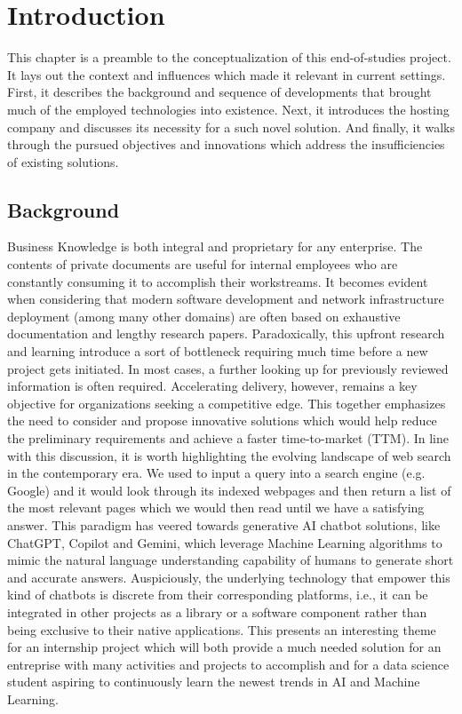 \chapter{Introduction}
This chapter is a preamble to the conceptualization of this end-of-studies project. It lays out the context and influences which made it relevant in current settings.\newline
First, it describes the background and sequence of developments that brought much of the employed technologies into existence. Next, it introduces the hosting company and discusses its necessity for a such novel solution. And finally, it walks through the pursued objectives and innovations which address the insufficiencies of existing solutions.
\newpage

\section{Background}
Business Knowledge is both integral and proprietary for any enterprise. The contents of private documents are useful for internal employees who are constantly consuming it to accomplish their workstreams. It becomes evident when considering that modern software development and network infrastructure deployment (among many other domains) are often based on exhaustive documentation and lengthy research papers. Paradoxically, this upfront research and learning introduce a sort of bottleneck requiring much time before a new project gets initiated. In most cases, a further looking up for previously reviewed information is often required. Accelerating delivery, however, remains a key objective for organizations seeking a competitive edge. This together emphasizes the need to consider and propose innovative solutions which would help reduce the preliminary requirements and achieve a faster time-to-market (TTM).\medskip\newline
In line with this discussion, it is worth highlighting the evolving landscape of web search in the contemporary era. We used to input a query into a search engine (e.g. Google) and it would look through its indexed webpages and then return a list of the most relevant pages which we would then read until we have a satisfying answer. This paradigm has veered towards generative AI chatbot solutions, like ChatGPT, Copilot and Gemini, which leverage Machine Learning algorithms to mimic the natural language understanding capability of humans to generate short and accurate answers.\smallskip\newline
Auspiciously, the underlying technology that empower this kind of chatbots is discrete from their corresponding platforms, i.e., it can be integrated in other projects as a library or a software component rather than being exclusive to their native applications. This presents an interesting theme for an internship project which will both provide a much needed solution for an entreprise with many activities and projects to accomplish and for a data science student aspiring to continuously learn the newest trends in AI and Machine Learning.
\newpage

